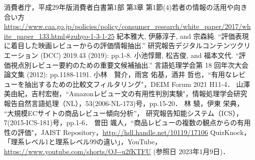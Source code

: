 \documentclass[platex,dvipdfmx,a4paper,twocolumn,base=10.5pt,jbase=10.5pt,ja=standard]{bxjsarticle}
\begin{document}
\begin{thebibliography}{99}
消費者庁，平成29年版消費者白書第1部 第3章 第1節(4)若者の情報の活用や向き合い方 \url{https://www.caa.go.jp/policies/policy/consumer_research/white_paper/2017/white_paper_133.html#zuhyo-1-3-1-25}
 紀本雅大, 伊藤淳子, and 宗森純. ``評価表現に着目した映画レビューからの評価情報抽出.'' 研究報告デジタルコンテンツクリエーション (DCC) 2019.43 (2019): pp.1-8.
 小池惇爾, 松吉俊, and 福本文代. ``評価視点別レビュー要約のための重要文候補抽出.'' 言語処理学会第 18 回年次大会論文集 (2012): pp.1188-1191.
 小林　賢介，雨宮 佑基，酒井 哲也，``有用なレビューを抽出するための比較文フィルタリング"，DEIM Forum 2021 H11-4．
 山澤美由紀，吉村宏樹，``Amazonレビュー文の有用性判別実験"，情報処理学会研究報告自然言語処理（NL），53(2006-NL-173)号，pp.15-20．
 林 驍，伊東 栄典， ``大規模ECサイトの商品レビュー傾向分析''，	
研究報告知能システム（ICS），7(2015-ICS-181)号，pp.1-6．
 曽田 颯人，``商品レビューの複数の観点からの有用性の評価"，JAIST Repository，\url{http://hdl.handle.net/10119/17106}
 QuizKnock，「理系レベル1と理系レベル99の違い」，YouTube，\url{https://www.youtube.com/shorts/OJ--u2fKTFU} (参照日 2023年1月9日)．

\end{thebibliography}
\end{document}
